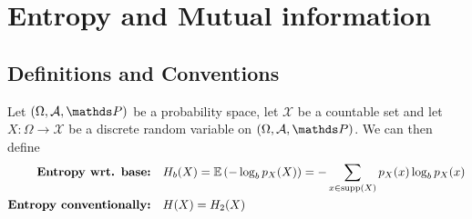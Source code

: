 \section{Entropy and Mutual information}
\subsection{Definitions and Conventions}

\begin{definition}
    Let $(\Omega, \mathcal{A}, \prob)$ be a probability space, let $\mathcal{X}$ be a countable set and
    let $X: \Omega \rightarrow \mathcal{X}$ be a discrete random variable on $(\Omega, \mathcal{A}, \prob)$.
    We can then define
    \begin{align*}
        \textbf{Entropy wrt. base:}       &\quad H_b(X) = \mathbb{E}\left(-\log_b p_X(X)\right) = -\sum_{x \in \operatorname{supp}(X)}{p_X(x) \log_b p_X(x)} \\
        \textbf{Entropy conventionally:}  &\quad H(X) = H_2(X)
    \end{align*}
\end{definition}

